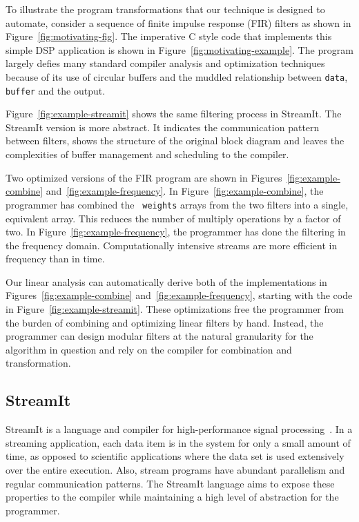 To illustrate the program transformations that our technique is
designed to automate, consider a sequence of finite impulse response
(FIR) filters as shown in Figure~\ref{fig:motivating-fig}. The
imperative C style code that implements this simple DSP application is
shown in Figure~\ref{fig:motivating-example}. 
The program largely defies many standard compiler analysis
and optimization techniques because of its use of circular buffers and
the muddled relationship between {\tt data}, {\tt buffer} and the
output.

Figure~\ref{fig:example-streamit} shows the same filtering process
in StreamIt. The StreamIt version is more abstract.  
It indicates the communication pattern between
filters, shows the structure of the original block diagram and leaves
the complexities of buffer management and scheduling to the compiler.

Two optimized versions of the FIR program are shown in
Figures~\ref{fig:example-combine} and~\ref{fig:example-frequency}.  In
Figure~\ref{fig:example-combine}, the programmer has combined the {\tt
weights} arrays from the two filters into a single, equivalent array.
This reduces the number of multiply operations by a factor of two.  In
Figure~\ref{fig:example-frequency}, the programmer has done the
filtering in the frequency domain.
Computationally intensive streams are more efficient
in frequency than in time.

Our linear analysis can automatically derive both of the
implementations in Figures~\ref{fig:example-combine}
and~\ref{fig:example-frequency}, starting with the code in
Figure~\ref{fig:example-streamit}.  These optimizations free the
programmer from the burden of combining and optimizing linear filters
by hand.  Instead, the programmer can design modular filters at the
natural granularity for the algorithm in question and rely on the
compiler for combination and transformation.

\subsection{StreamIt}

StreamIt is a language and compiler for high-performance signal
processing~\cite{gordon-thesis,streamit-asplos,streamitcc}.  In a
streaming application, each data item is in the system for only a
small amount of time, as opposed to scientific applications where the
data set is used extensively over the entire execution.  Also, stream
programs have abundant parallelism and regular communication patterns.
The StreamIt language aims to expose these properties to the compiler
while maintaining a high level of abstraction for the programmer.

